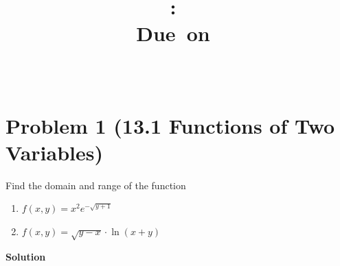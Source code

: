 \documentclass{article}
\title{
    \vspace{2in}
    \textmd{\textbf{\hmwkClass:\ \hmwkTitle}}\\
    \normalsize\vspace{0.1in}\small{Due\ on\ \hmwkDueDate}\\
    \vspace{0.1in}\large{\textit{\hmwkClassInstructor\ \hmwkClassTime}}
    \vspace{3in}
}
\author{\hmwkAuthorName}
\date{}
\newcommand{\solution}{\textbf{\large Solution}}
\theoremstyle{remark}
\begin{document}
\maketitle
\newpage

\section*{Problem 1 (13.1 Functions of Two Variables)}
Find the domain and range of the function
\begin{enumerate}[label=(\alph*)]
    \item $f(x, y) = x^2 e^{-\sqrt{y+1}}$
    \item $f(x, y) = \sqrt{y - x}\cdot \ln (x + y)$
\end{enumerate}

\medskip
\solution
\end{document}
